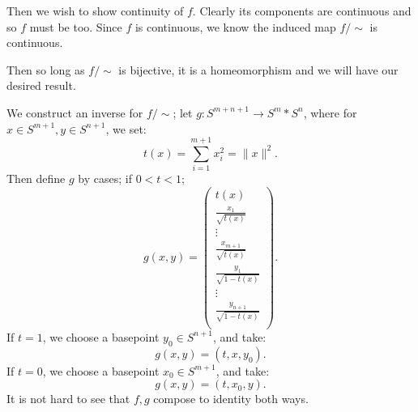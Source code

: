 \documentclass{article}
\begin{document}
Then we wish to show continuity of $f$. Clearly its components are continuous and so $f$ must be too. Since $f$ is continuous, we know the induced map $f / \sim $ is continuous.

Then so long as $f /\sim $ is bijective, it is a homeomorphism and we will have our desired result.

We construct an inverse for $f / \sim $; let $g:S^{m+n+1}\to S^{m}*S^{n}$, where for $x\in S^{m+1},y\in S^{n+1}$, we set:
\[
t(x)=\sum_{i=1}^{m+1} x_{i}^2=\|x\|^2
.\] 
Then define $g$ by cases; if $0<t<1$;
\[
    g(x,y)
    =\begin{pmatrix} 
        t(x)\\
        \frac{x_1}{\sqrt{t(x)} }\\
        \vdots\\
        \frac{x_{m+1}}{\sqrt{t(x)} }\\
        \frac{y_1}{\sqrt{1-t(x)} }\\
        \vdots\\
        \frac{y_{n+1}}{\sqrt{1-t(x)} }\\
    \end{pmatrix} 
.\] 
If $t=1$, we choose a basepoint $y_0\in S^{n+1}$, and take:
\[
g(x,y)=(t,x,y_0)
.\] 
If $t=0$, we choose a basepoint $x_0\in S^{m+1}$, and take:
\[
g(x,y)=(t,x_0,y)
.\] 
It is not hard to see that $f,g$ compose to identity both ways. %

\end{document}
